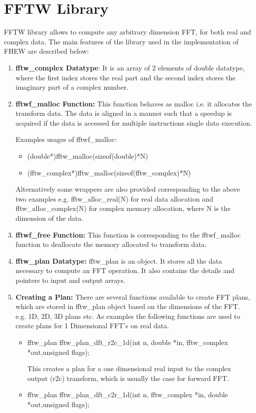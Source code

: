 \section{FFTW Library}
FFTW library allows to compute any arbitrary dimension FFT, for both real and complex data. The main features of the library used in the implementation of FHEW are described below:
\begin{enumerate}
\item
\textbf{fftw\_complex Datatype}: It is an array of 2 elements of double datatype, where the first index stores the real part and the second index stores the imaginary part of a complex number.
\item
\textbf{fftwf\_malloc Function:} This function behaves as malloc i.e. it allocates the transform data. The data is aligned in a manner such that a speedup is acquired if the data is accessed for multiple instructions single data execution.

\noindent Examples usages of fftwf\_malloc:
\begin{itemize}
\item
(double*)fftw\_malloc(sizeof(double)*N)
\item
(fftw\_complex*)fftw\_malloc(sizeof(fftw\_complex)*N)
\end{itemize}
Alternatively some wrappers are also provided corresponding to the above two examples e.g. fftw\_alloc\_real(N) for real data allocation and fftw\_alloc\_complex(N) for complex memory allocation, where N is the dimension of the data.
\item
\textbf{fftwf\_free Function:} This function is corresponding to the fftwf\_malloc function to deallocate the memory allocated to transform data.
\item
\textbf{fftw\_plan Datatype:} fftw\_plan is an object. It stores all the data necessary to compute an FFT operation. It also contains the details and pointers to input and output arrays. 
\item
\textbf{Creating a Plan:} There are several functions available to create FFT plans, which are stored in fftw\_plan object based on the dimensions of the FFT. e.g. 1D, 2D, 3D plans etc.
As examples the following functions are used to create plans for 1 Dimensional FFT's on real data. 
\begin{itemize}
\item
fftw\_plan fftw\_plan\_dft\_r2c\_1d(int n, double *in, fftw\_complex *out,unsigned flags);

This creates a plan for a one dimensional real input to the complex output (r2c) transform, which is usually the case for forward FFT.
\vspace{0.25cm}
\item
fftw\_plan fftw\_plan\_dft\_c2r\_1d(int n, fftw\_complex *in, double *out,unsigned flags);


\end{itemize}
\end{enumerate}
